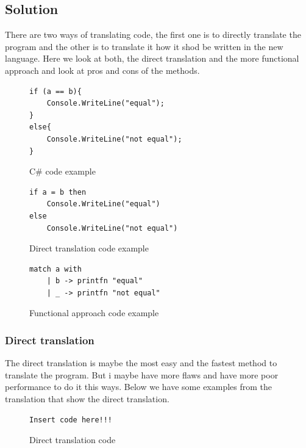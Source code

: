 \documentclass[12pt, a4paper]{article}
\begin{document}
\subsection{Solution}
There are two ways of translating code, the first one is to directly translate the program and the other is to translate it how it shod be written in the new language. Here we look at both, the direct translation and the more functional approach and look at pros and cons of the methods.

\begin{figure}[!h]
\begin{lstlisting}
if (a == b){
	Console.WriteLine("equal");
}
else{
	Console.WriteLine("not equal");
}
\end{lstlisting}
\caption{C\# code example}
\label{fig:CSharpIf}
\end{figure}

\begin{figure}[!h]
\begin{lstlisting}
if a = b then 
	Console.WriteLine("equal")
else 
	Console.WriteLine("not equal")
\end{lstlisting}
\caption{Direct translation code example}
\label{fig:directTranslationIf}
\end{figure}

\begin{figure}[!h]
\begin{lstlisting}
match a with
    | b -> printfn "equal"
    | _ -> printfn "not equal"
\end{lstlisting}
\caption{Functional approach code example}
\label{fig:functionalApproachIf}
\end{figure}

\newpage

\subsubsection{Direct translation}
The direct translation is maybe the most easy and the fastest method to translate the program. But i maybe have more flaws and have more poor performance to do it this ways. Below we have some examples from the translation that show the direct translation.

\begin{figure}[!h]
\begin{lstlisting}
Insert code here!!!
\end{lstlisting}
\caption{Direct translation code}
\end{figure}
\end{document}
